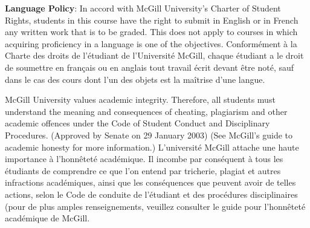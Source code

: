 \documentclass[12]{article}
\begin{document}
\vskip 0.1in
\noindent
{\textbf{Language Policy}}:\newline
\noindent
In accord with McGill University’s Charter of Student Rights, students
in this course have the right to submit in English or in French any
written work that is to be graded. This does not apply to courses in
which acquiring proficiency in a language is one of the objectives.
\vskip 0.05in
\noindent
Conformément à la Charte des droits de l’étudiant de l’Université
McGill, chaque étudiant a le droit de soumettre en français ou en
anglais tout travail écrit devant être noté, sauf dans le cas des
cours dont l’un des objets est la maîtrise d’une langue. 
\vskip 0.1in

\newline
\noindent
McGill University values academic integrity. Therefore, all students
must understand the meaning and consequences of cheating, plagiarism
and other academic offences under the Code of Student Conduct and
Disciplinary Procedures. (Approved by Senate on 29 January 2003) (See
McGill’s guide to academic honesty for more information.)
\vskip 0.05in
\noindent
L'université McGill attache une haute importance à l’honnêteté
académique. Il incombe par conséquent à tous les étudiants de
comprendre ce que l'on entend par tricherie, plagiat et autres
infractions académiques, ainsi que les conséquences que peuvent
avoir de telles actions, selon le Code de conduite de l'étudiant et
des procédures disciplinaires (pour de plus amples renseignements,
veuillez consulter le guide pour l’honnêteté académique de McGill.
\end{document}
